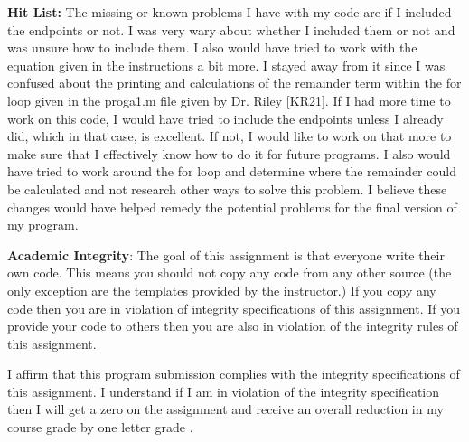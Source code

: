 \documentclass{article}
\begin{document}
{\bf Hit List: }{\color{black} The missing or known problems I have with my code are if I included the endpoints or not.  I was very wary about whether I included them or not and was unsure how to include them.  I also would have tried to work with the equation given in the instructions a bit more.  I stayed away from it since I was confused about the printing and calculations of the remainder term within the for loop given in the proga1.m file given by Dr. Riley [KR21].  If I had more time to work on this code, I would have tried to include the endpoints unless I already did, which in that case, is excellent.  If not, I would like to work on that more to make sure that I effectively know how to do it for future programs.  I also would have tried to work around the for loop and determine where the remainder could be calculated and not research other ways to solve this problem.  I believe these changes would have helped remedy the potential problems for the final version of my program.}
\par \bigskip \par


{\bf Academic Integrity}: {\color{black} The goal of this assignment is that everyone write their own code. This means you should not copy any code from any other source (the only exception are the templates provided by the instructor.) If you copy any code then you are in violation of integrity specifications of this assignment. If you provide your code to others then you are also in violation of the integrity rules of this assignment. }
\par \bigskip \par
      {\color{black} I affirm that this program submission complies with the integrity specifications of this assignment. I understand if I am in violation of the integrity specification then I will get a zero on the assignment and receive an overall reduction in my course grade by one letter grade
      }.

\end{document}
